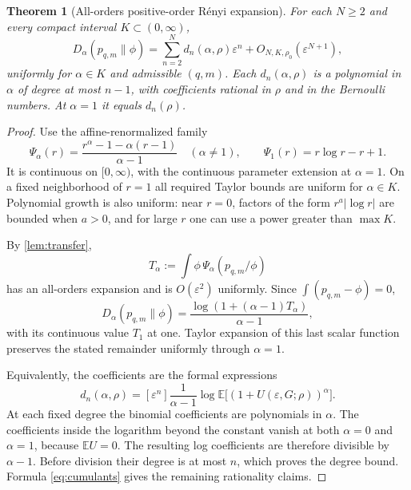 \documentclass[11pt,a4paper]{article}
\numberwithin{equation}{section}
\newtheorem{theorem}{Theorem}[section]
\theoremstyle{definition}
\theoremstyle{remark}
\newcommand{\E}{\mathbb E}
\newcommand{\eps}{\varepsilon}
\newcommand{\co}[2]{[#1^{#2}]}
\begin{document}
\begin{theorem}[All-orders positive-order R\'enyi expansion]
\label{thm:renyi}
For each $N\ge2$ and every compact interval
$K\subset(0,\infty)$,
\begin{equation}
 D_\alpha(p_{q,m}\|\phi)
 =\sum_{n=2}^{N}d_n(\alpha,\rho)\eps^n
  +O_{N,K,\rho_0}(\eps^{N+1}),
 \label{eq:renyi-expansion}
\end{equation}
uniformly for $\alpha\in K$ and admissible $(q,m)$. Each
$d_n(\alpha,\rho)$ is a polynomial in $\alpha$ of degree at most $n-1$,
with coefficients rational in $\rho$ and in the Bernoulli numbers.
At $\alpha=1$ it equals $d_n(\rho)$.
\end{theorem}
\begin{proof}
Use the affine-renormalized family
\begin{equation}
 \Psi_\alpha(r)=
 \frac{r^\alpha-1-\alpha(r-1)}{\alpha-1}
 \quad(\alpha\ne1),\qquad
 \Psi_1(r)=r\log r-r+1.
 \label{eq:tsallis-psi}
\end{equation}
It is continuous on $[0,\infty)$, with the continuous parameter extension at
$\alpha=1$. On a fixed neighborhood of $r=1$ all required Taylor bounds
are uniform for $\alpha\in K$. Polynomial growth is also uniform: near
$r=0$, factors of the form $r^a|\log r|$ are bounded when $a>0$, and for
large $r$ one can use a power greater than $\max K$.

By \cref{lem:transfer},
\[
 T_\alpha:=\int\phi\,\Psi_\alpha(p_{q,m}/\phi)
\]
has an all-orders expansion and is $O(\eps^2)$ uniformly. Since
$\int(p_{q,m}-\phi)=0$,
\begin{equation}
 D_\alpha(p_{q,m}\|\phi)
 =\frac{\log(1+(\alpha-1)T_\alpha)}{\alpha-1},
 \label{eq:log-tsallis}
\end{equation}
with its continuous value $T_1$ at one. Taylor expansion of this last scalar
function preserves the stated remainder uniformly through $\alpha=1$.

Equivalently, the coefficients are the formal expressions
\begin{equation}
 d_n(\alpha,\rho)
 =\co{\eps}{n}\frac1{\alpha-1}
  \log\E\bigl[(1+U(\eps,G;\rho))^\alpha\bigr].
 \label{eq:renyi-coefficient}
\end{equation}
At each fixed degree the binomial coefficients are polynomials in $\alpha$.
The coefficients inside the logarithm beyond the constant vanish at both
$\alpha=0$ and $\alpha=1$, because $\E U=0$. The resulting log coefficients
are therefore divisible by $\alpha-1$. Before division their degree is at
most $n$, which proves the degree bound. Formula
\eqref{eq:cumulants} gives the remaining rationality claims.
\end{proof}
\end{document}
